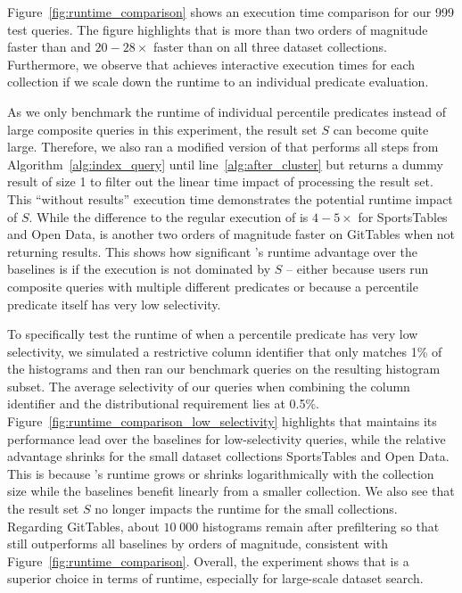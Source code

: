 Figure~\ref{fig:runtime_comparison} shows an execution time comparison for our 999 test queries.
The figure highlights that \approximate{} is more than two orders of magnitude faster than \pscan and $20-28\times$ faster than \binsort on all three dataset collections.
Furthermore, we observe that \approximate{} achieves interactive execution times for each collection if we scale down the runtime to an individual predicate evaluation.

As we only benchmark the runtime of individual percentile predicates instead of large composite queries in this experiment, the result set $S$ can become quite large.
Therefore, we also ran a modified version of \system{} that performs all steps from Algorithm~\ref{alg:index_query} until line~\ref{alg:after_cluster} but returns a dummy result of size 1 to filter out the linear time impact of processing the result set.
This ``without results'' execution time demonstrates the potential runtime impact of $S$.
While the difference to the regular execution of \system{} is $4-5\times$ for SportsTables and Open Data, \system{} is another two orders of magnitude faster on GitTables when not returning results.
This shows how significant \system{}'s runtime advantage over the baselines is if the execution is not dominated by $S$ -- either because users run composite queries with multiple different predicates or because a percentile predicate itself has very low selectivity.

To specifically test the runtime of \system{} when a percentile predicate has very low selectivity, we simulated a restrictive column identifier that only matches 1\% of the histograms and then ran our benchmark queries on the resulting histogram subset.
The average selectivity of our queries when combining the column identifier and the distributional requirement lies at 0.5\%.
Figure~\ref{fig:runtime_comparison_low_selectivity} highlights that \system{} maintains its performance lead over the baselines for low-selectivity queries, while the relative advantage shrinks for the small dataset collections SportsTables and Open Data.
This is because \system{}'s runtime grows or shrinks logarithmically with the collection size while the baselines benefit linearly from a smaller collection.
We also see that the result set $S$ no longer impacts the runtime for the small collections.
Regarding GitTables, about $10\;000$ histograms remain after prefiltering so that \system{} still outperforms all baselines by orders of magnitude, consistent with Figure~\ref{fig:runtime_comparison}.
Overall, the experiment shows that \system{} is a superior choice in terms of runtime, especially for large-scale dataset search.

